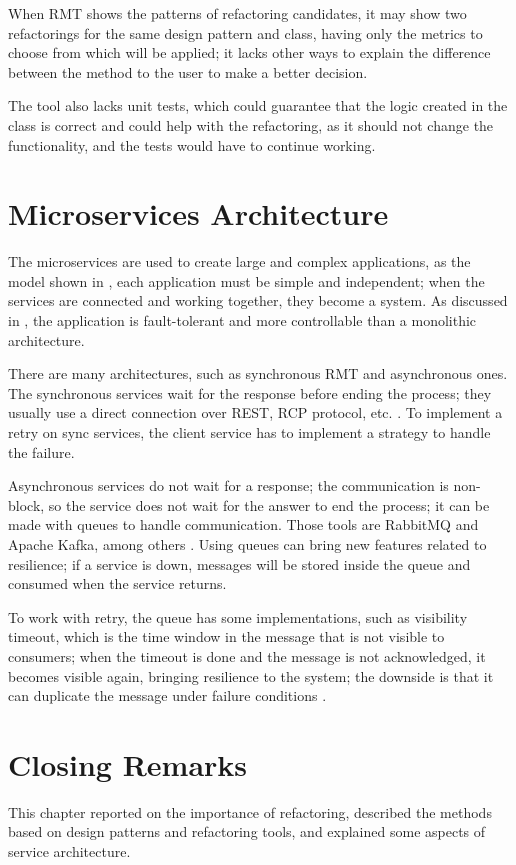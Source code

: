 When RMT shows the patterns of refactoring candidates, it may show two refactorings for the same design pattern and class, having only the metrics to choose from which will be applied; it lacks other ways to explain the difference between the method to the user to make a better decision.

The tool also lacks unit tests, which could guarantee that the logic created in the class is correct and could help with the refactoring, as it should not change the functionality, and the tests would have to continue working.

\section{Microservices Architecture}
\label{sec-microservices}
The microservices are used to create large and complex applications, as the model shown in , each application must be simple and independent; when the services are connected and working together, they become a system. As discussed in \textcite{microservices-comuni}, the application is fault-tolerant and more controllable than a monolithic architecture.

There are many architectures, such as synchronous RMT and asynchronous ones. The synchronous services wait for the response before ending the process; they usually use a direct connection over REST, RCP protocol, etc. \cite{microservices-comuni}. To implement a retry on sync services, the client service has to implement a strategy to handle the failure.

Asynchronous services do not wait for a response; the communication is non-block, so the service does not wait for the answer to end the process; it can be made with queues to handle communication. Those tools are RabbitMQ and Apache Kafka, among others \textcite{KARABEYAKSAKALLI2021111014}. Using queues can bring new features related to resilience; if a service is down, messages will be stored inside the queue and consumed when the service returns\cite{Cebeci2020DesignOA}. 

To work with retry, the queue has some implementations, such as visibility timeout, which is the time window in the message that is not visible to consumers; when the timeout is done and the message is not acknowledged, it becomes visible again, bringing resilience to the system; the downside is that it can duplicate the message under failure conditions \cite{ChenScalable}.

\section{Closing Remarks}
\label{sec2-remarks}
This chapter reported on the importance of refactoring, described the methods based on design patterns and refactoring tools, and explained some aspects of service architecture.

